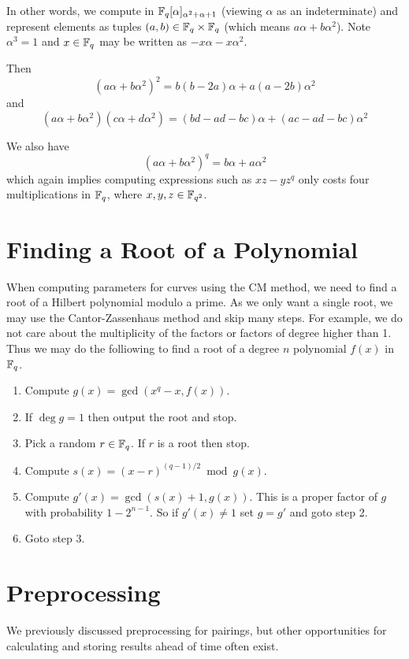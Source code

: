 In other words, we compute in $\mathbb{F}_q[\alpha]_{\alpha^2+\alpha+1}$
(viewing $\alpha$ as an indeterminate) and represent elements
as tuples $(a,b) \in \mathbb{F}_q \times \mathbb{F}_q$ (which means $a \alpha + b \alpha^2$).
Note $\alpha^3 = 1$ and $x\in\mathbb{F}_q$ may be written as $-x \alpha - x\alpha^2$.

Then
\[ (a \alpha + b \alpha^2)^2 = b(b-2a)\alpha + a(a-2b)\alpha^2 \]
and
\[ (a \alpha + b \alpha^2)(c \alpha + d \alpha^2) =
(bd-ad-bc)\alpha + (ac-ad-bc)\alpha^2 \]

We also have
\[ (a\alpha + b\alpha^2)^q = b\alpha + a\alpha^2 \]
which again implies computing expressions such as $x z - y z^q$ only
costs four multiplications in $\mathbb{F}_q$, where $x,y,z \in \mathbb{F}_{q^2}$.

\section{Finding a Root of a Polynomial}

When computing parameters for curves using the CM method, we
need to find a root of a Hilbert polynomial modulo a prime.
As we only want a single root, we may use the Cantor-Zassenhaus
method and skip many steps. For example, we do not care about
the multiplicity of the factors or factors of degree higher than 1.
Thus we may do the folliowing to find a root of a
degree $n$ polynomial $f(x)$ in
$\mathbb{F}_q$.

\begin{enumerate}
\item
Compute $g(x) = \gcd(x^q - x, f(x))$.
\item
If $\deg g = 1$ then output the root and stop.
\item
Pick a random $r \in \mathbb{F}_q$. If $r$ is a root then stop.
\item
Compute $s(x) = (x-r)^{(q-1)/2} \bmod g(x)$.
\item
Compute $g'(x) = \gcd(s(x)+1, g(x))$. This is a proper factor of $g$
with probability $1 - 2^{n-1}$. So if $g'(x) \ne 1$ set $g = g'$ and
goto step 2.
\item
Goto step 3.
\end{enumerate}

\section{Preprocessing}

We previously discussed preprocessing for pairings,
but other opportunities for
calculating and storing results ahead of time often exist.

